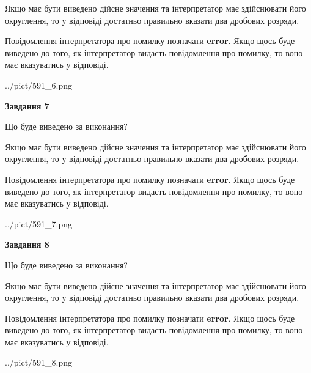 \documentclass[12pt, ukrainian]{article}
\begin{document}
{\begin {Large}
Якщо має бути виведено дійсне значення та інтерпретатор має здійснювати його округлення, 
то у відповіді достатньо правильно вказати два дробових розряди.

Повідомлення інтерпретатора про помилку позначати \textbf{error}.
Якщо щось буде виведено до того, як інтерпретатор видасть повідомлення про помилку, 
то воно має вказуватись у відповіді. \par

\begin{center}
	{../pict/591_6.png}
\end{center}
\newpage

{\begin {center}\textbf{Завдання 7}\end {center}}\par
Що буде виведено за виконання? \par

Якщо має бути виведено дійсне значення та інтерпретатор має здійснювати його округлення, 
то у відповіді достатньо правильно вказати два дробових розряди.

Повідомлення інтерпретатора про помилку позначати \textbf{error}.
Якщо щось буде виведено до того, як інтерпретатор видасть повідомлення про помилку, 
то воно має вказуватись у відповіді. \par

\begin{center}
	{../pict/591_7.png}
\end{center}
\newpage

{\begin {center}\textbf{Завдання 8}\end {center}}\par
Що буде виведено за виконання? \par

Якщо має бути виведено дійсне значення та інтерпретатор має здійснювати його округлення, 
то у відповіді достатньо правильно вказати два дробових розряди.

Повідомлення інтерпретатора про помилку позначати \textbf{error}.
Якщо щось буде виведено до того, як інтерпретатор видасть повідомлення про помилку, 
то воно має вказуватись у відповіді. \par

\begin{center}
	{../pict/591_8.png}
\end{center}
\newpage


\end{Large}}
\end{document}
